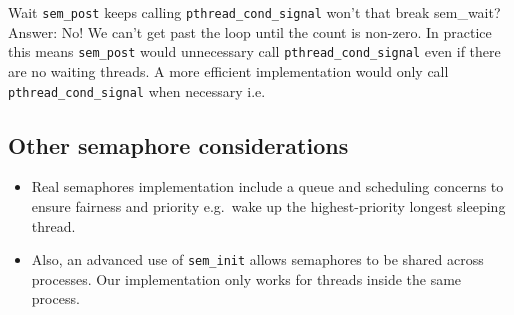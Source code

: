 \begin{Shaded}
\begin{Highlighting}[]
   \NormalTok{) \{}
  \NormalTok{\}}
\NormalTok{\}}
\end{Highlighting}
\end{Shaded}

Wait \texttt{sem\_post} keeps calling \texttt{pthread\_cond\_signal}
won't that break sem\_wait?\\Answer: No! We can't get past the loop
until the count is non-zero. In practice this means \texttt{sem\_post}
would unnecessary call \texttt{pthread\_cond\_signal} even if there are
no waiting threads. A more efficient implementation would only call
\texttt{pthread\_cond\_signal} when necessary i.e.

\begin{Shaded}
\begin{Highlighting}[]
   \NormalTok{) }
\end{Highlighting}
\end{Shaded}

\subsection{Other semaphore
considerations}\label{other-semaphore-considerations}

\begin{itemize}
\itemsep1pt\parskip0pt
\item
  Real semaphores implementation include a queue and scheduling concerns
  to ensure fairness and priority e.g.~wake up the highest-priority
  longest sleeping thread.
\item
  Also, an advanced use of \texttt{sem\_init} allows semaphores to be
  shared across processes. Our implementation only works for threads
  inside the same process.
\end{itemize}
